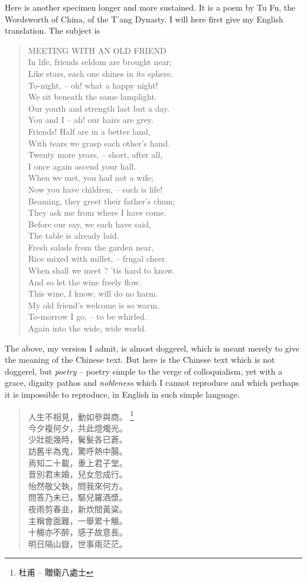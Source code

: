 Here is another specimen longer and more sustained.
It is a poem by Tu Fu, the Wordsworth of China, of the T'ang Dynasty.
I will here first give my English translation. The subject is
\begin{quote}
MEETING WITH AN OLD FRIEND \\
In life, friends seldom are brought near; \\
Like stars, each one shines in its sphere. \\
To-night, -- oh! what a happy night! \\
We sit beneath the same lamplight. \\
Our youth and strength last but a day. \\
You and I -- ah! our hairs are grey. \\
Friends! Half are in a better land, \\
With tears we grasp each other's hand. \\
Twenty more years,  -- short, after all, \\
I once again ascend your hall. \\
When we met, you had not a wife; \\
Now you have children,  -- such is life! \\
Beaming, they greet their father's chum; \\
They ask me from where I have come. \\
Before our say, we each have said, \\
The table is already laid. \\
Fresh salads from the garden near, \\
Rice mixed with millet,  -- frugal cheer. \\
When shall we meet ? 'tis hard to know. \\
And so let the wine freely flow. \\
This wine, I know, will do no harm. \\
My old friend's welcome is so warm. \\
To-morrow I go,  -- to be whirled. \\
Again into the wide, wide world.
\end{quote}

The above, my version I admit, is almost doggerel,
which is meant merely to give the meaning of the Chinese text.
But here is the Chinese text which is not doggerel, but \emph{poetry}
-- poetry simple to the verge of colloquialism, yet with a grace,
dignity pathos and \emph{nobleness}
which I cannot reproduce and which perhaps it is impossible to reproduce,
in English in such simple language.

\begin{quote}
人生不相見，動如參與商。 \footnote{杜甫 -- 贈衛八處士} \\
今夕複何夕，共此燈燭光。 \\
少壯能幾時，鬢髮各已蒼。 \\
訪舊半為鬼，驚呼熱中腸。 \\
焉知二十載，重上君子堂。 \\
昔別君未婚，兒女忽成行。 \\
怡然敬父執，問我來何方。 \\
問答乃未已，驅兒羅酒漿。 \\
夜雨剪春韭，新炊間黃粱。 \\
主稱會面難，一舉累十觴。 \\
十觴亦不醉，感子故意長。 \\
明日隔山嶽，世事兩茫茫。
\end{quote}